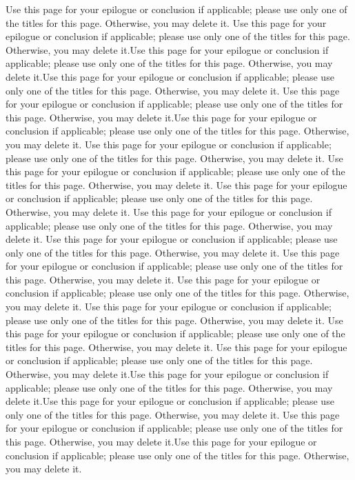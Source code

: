 \begin{flushleft}
Use this page for your epilogue or conclusion if applicable; please use only one of the titles for this page. Otherwise, you may delete it.
Use this page for your epilogue or conclusion if applicable; please use only one of the titles for this page. Otherwise, you may delete it.Use this page for your epilogue or conclusion if applicable; please use only one of the titles for this page. Otherwise, you may delete it.Use this page for your epilogue or conclusion if applicable; please use only one of the titles for this page. Otherwise, you may delete it.
Use this page for your epilogue or conclusion if applicable; please use only one of the titles for this page. Otherwise, you may delete it.Use this page for your epilogue or conclusion if applicable; please use only one of the titles for this page. Otherwise, you may delete it.
Use this page for your epilogue or conclusion if applicable; please use only one of the titles for this page. Otherwise, you may delete it.
Use this page for your epilogue or conclusion if applicable; please use only one of the titles for this page. Otherwise, you may delete it.
Use this page for your epilogue or conclusion if applicable; please use only one of the titles for this page. Otherwise, you may delete it.
Use this page for your epilogue or conclusion if applicable; please use only one of the titles for this page. Otherwise, you may delete it.
Use this page for your epilogue or conclusion if applicable; please use only one of the titles for this page. Otherwise, you may delete it.
Use this page for your epilogue or conclusion if applicable; please use only one of the titles for this page. Otherwise, you may delete it.
Use this page for your epilogue or conclusion if applicable; please use only one of the titles for this page. Otherwise, you may delete it.
Use this page for your epilogue or conclusion if applicable; please use only one of the titles for this page. Otherwise, you may delete it.
Use this page for your epilogue or conclusion if applicable; please use only one of the titles for this page. Otherwise, you may delete it.
Use this page for your epilogue or conclusion if applicable; please use only one of the titles for this page. Otherwise, you may delete it.Use this page for your epilogue or conclusion if applicable; please use only one of the titles for this page. Otherwise, you may delete it.Use this page for your epilogue or conclusion if applicable; please use only one of the titles for this page. Otherwise, you may delete it.
Use this page for your epilogue or conclusion if applicable; please use only one of the titles for this page. Otherwise, you may delete it.Use this page for your epilogue or conclusion if applicable; please use only one of the titles for this page. Otherwise, you may delete it.

\end{flushleft}
